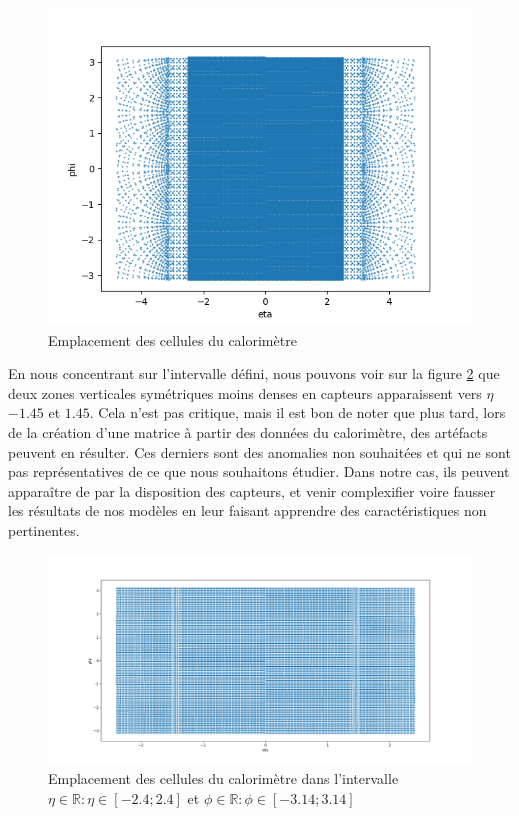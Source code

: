 \begin{figure}[hbt!]
    \centering
    \includegraphics[scale=0.7]{Figures/dataset/calorimeter_cells.png}
    \caption{Emplacement des cellules du calorimètre}
    \label{fig:calocells_location}
\end{figure}

En nous concentrant sur l'intervalle défini, nous pouvons voir sur la figure \ref{fig:calocells_location_eta_reduced} que deux zones verticales symétriques moins denses en capteurs apparaissent vers $\eta$ $-1.45$ et $1.45$. Cela n'est pas critique, mais il est bon de noter que plus tard, lors de la création d'une matrice à partir des données du calorimètre, des artéfacts peuvent en résulter. Ces derniers sont des anomalies non souhaitées et qui ne sont pas représentatives de ce que nous souhaitons étudier. Dans notre cas, ils peuvent apparaître de par la disposition des capteurs, et venir complexifier voire fausser les résultats de nos modèles en leur faisant apprendre des caractéristiques non pertinentes.

\begin{figure}[hbt!]
    \centering
    \includegraphics[scale=0.3]{Figures/dataset/calorimeter_cells_eta_reduced.png}
    \caption{Emplacement des cellules du calorimètre dans l'intervalle $\eta \in \mathbb{R} : \eta \in [-2.4;2.4]$ et $\phi \in \mathbb{R} : \phi \in [-3.14;3.14]$}
    \label{fig:calocells_location_eta_reduced}
\end{figure}

